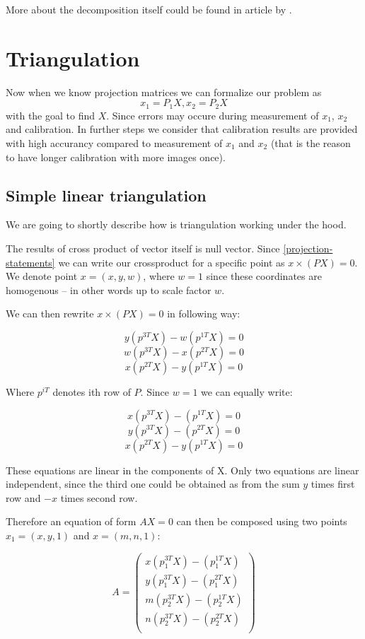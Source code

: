 More about the decomposition itself could be found in article by \citet{computervisionblog}.

\section{Triangulation}
Now when we know projection matrices we can formalize our problem as 
\begin{equation}
x_1 = P_1X, x_2 = P_2X \label{projection-statements}
\end{equation}
with the goal to find $X$. Since errors may occure during
measurement of $x_1$, $x_2$ and calibration. In further steps we consider that
calibration results are provided with high accurancy compared to measurement of
$x_1$ and $x_2$ (that is the reason to have longer calibration with more images
once).

\subsection{Simple linear triangulation}
We are going to shortly describe how is triangulation working under the hood.

The results of cross product of vector itself is null vector. Since
\ref{projection-statements} we can write our crossproduct for a specific point
as $x \times (PX) = 0$. We denote point $x = (x, y, w)$, where $w = 1$ since
these coordinates are homogenous -- in other words up to scale factor $w$.

We can then rewrite $x \times (PX) = 0$ in following way:

$$ y(p^{3T}X) - w(p^{1T}X) = 0 $$
$$ w(p^{3T}X) - x(p^{2T}X) = 0 $$
$$ x(p^{2T}X) - y(p^{1T}X) = 0 $$

Where $p^{iT}$ denotes ith row of $P$. Since $w = 1$ we can equally write:

$$ x(p^{3T}X) - (p^{1T}X) = 0 $$
$$ y(p^{3T}X) - (p^{2T}X) = 0 $$
$$ x(p^{2T}X) - y(p^{1T}X) = 0 $$

These equations are linear in the components of X. Only two equations are
linear independent, since the third one could be obtained as from the sum $y$
times first row and $-x$ times second row.

Therefore an equation of form $AX = 0$ can then be composed using two points $x_1 = (x, y, 1)$ and $x = (m, n, 1)$:

\[
A = \begin{pmatrix}
x(p_1^{3T}X) - (p_1^{1T}X) \\
y(p_1^{3T}X) - (p_1^{2T}X) \\
m(p_2^{3T}X) - (p_2^{1T}X) \\
n(p_2^{3T}X) - (p_2^{2T}X) \\
\end{pmatrix}
\] 

